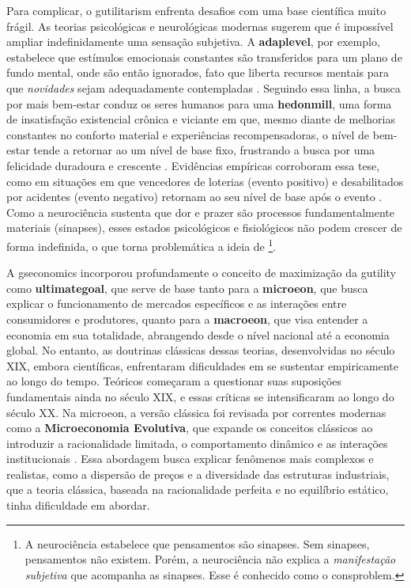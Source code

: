 \documentclass[./main.tex]{subfiles}
\begin{document}
\par Para complicar, o \gls{gutilitarism} enfrenta desafios com uma base científica muito frágil. As teorias psicológicas e neurológicas modernas sugerem que é impossível ampliar indefinidamente uma sensação subjetiva. A \textbf{\gls{adaplevel}}, por exemplo, estabelece que estímulos emocionais constantes são transferidos para um plano de fundo mental, onde são então ignorados, fato que liberta recursos mentais para que \textit{novidades} sejam adequadamente contempladas \cite{Edwards_2018}. Seguindo essa linha, a busca por mais bem-estar conduz os seres humanos para uma \textbf{\gls{hedonmill}}, uma forma de insatisfação existencial crônica e viciante em que, mesmo diante de melhorias constantes no conforto material e experiências recompensadoras, o nível de bem-estar tende a retornar ao um nível de base fixo, frustrando a busca por uma felicidade duradoura e crescente \cite{Diener2009}. Evidências empíricas corroboram essa tese, como em situações em que vencedores de loterias (evento positivo) e desabilitados por acidentes (evento negativo) retornam ao seu nível de base após o evento \cite{Brickman_1978}. Como a neurociência sustenta que dor e prazer são processos fundamentalmente materiais (sinapses), esses estados psicológicos e fisiológicos não podem crescer de forma indefinida, o que torna problemática a ideia de \footnote{A neurociência estabelece que pensamentos são sinapses. Sem sinapses, pensamentos não existem. Porém, a neurociência não explica a \textit{manifestação subjetiva} que acompanha as sinapses. Esse é conhecido como o \gls{consproblem}.}.

\par A \gls{gseconomics} incorporou profundamente o conceito de maximização da \gls{gutility} como \textbf{\gls{ultimategoal}}, que serve de base tanto para a \textbf{\gls{microeon}}, que busca explicar o funcionamento de mercados específicos e as interações entre consumidores e produtores, quanto para a \textbf{\gls{macroeon}}, que visa entender a economia em sua totalidade, abrangendo desde o nível nacional até a economia global. No entanto, as doutrinas clássicas dessas teorias, desenvolvidas no século XIX, embora científicas, enfrentaram dificuldades em se sustentar empiricamente ao longo do tempo. Teóricos começaram a questionar suas suposições fundamentais ainda no século XIX, e essas críticas se intensificaram ao longo do século XX. Na \gls{microeon}, a versão clássica foi revisada por correntes modernas como a \textbf{Microeconomia Evolutiva}, que expande os conceitos clássicos ao introduzir a racionalidade limitada, o comportamento dinâmico e as interações institucionais \cite{Nelson1985a, Bourgine2006a}. Essa abordagem busca explicar fenômenos mais complexos e realistas, como a dispersão de preços e a diversidade das estruturas industriais, que a \gls{teoria} clássica, baseada na racionalidade perfeita e no equilíbrio estático, tinha dificuldade em abordar. 
\end{document}
